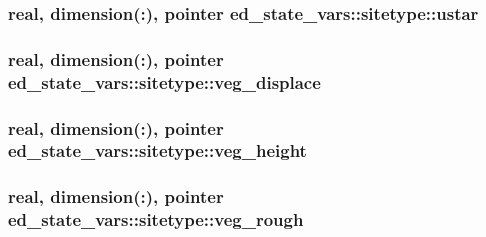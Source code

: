 \subsubsection[{\texorpdfstring{ustar}{ustar}}]{\setlength{\rightskip}{0pt plus 5cm}real, dimension(\+:), pointer ed\+\_\+state\+\_\+vars\+::sitetype\+::ustar}\hypertarget{structed__state__vars_1_1sitetype_a0c0d2d0d092f53781cd5d016ba86bf6c}{}\label{structed__state__vars_1_1sitetype_a0c0d2d0d092f53781cd5d016ba86bf6c}
\subsubsection[{\texorpdfstring{veg\+\_\+displace}{veg_displace}}]{\setlength{\rightskip}{0pt plus 5cm}real, dimension(\+:), pointer ed\+\_\+state\+\_\+vars\+::sitetype\+::veg\+\_\+displace}\hypertarget{structed__state__vars_1_1sitetype_a96402fc9b366af0d4b325f3902af94e4}{}\label{structed__state__vars_1_1sitetype_a96402fc9b366af0d4b325f3902af94e4}
\subsubsection[{\texorpdfstring{veg\+\_\+height}{veg_height}}]{\setlength{\rightskip}{0pt plus 5cm}real, dimension(\+:), pointer ed\+\_\+state\+\_\+vars\+::sitetype\+::veg\+\_\+height}\hypertarget{structed__state__vars_1_1sitetype_a9759bdb8aaf421a298c17d68d15b2116}{}\label{structed__state__vars_1_1sitetype_a9759bdb8aaf421a298c17d68d15b2116}
\subsubsection[{\texorpdfstring{veg\+\_\+rough}{veg_rough}}]{\setlength{\rightskip}{0pt plus 5cm}real, dimension(\+:), pointer ed\+\_\+state\+\_\+vars\+::sitetype\+::veg\+\_\+rough}\hypertarget{structed__state__vars_1_1sitetype_aba6c50efac9f98d58ea029816316f5b1}{}\label{structed__state__vars_1_1sitetype_aba6c50efac9f98d58ea029816316f5b1}
